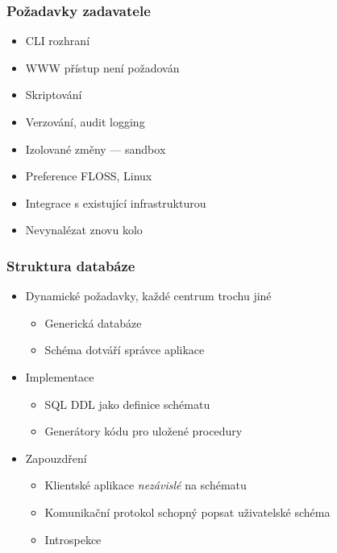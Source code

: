 \documentclass{beamer}
\begin{document}
\begin{frame}[fragile]
\frametitle{Požadavky zadavatele}
\begin{itemize}
    \item CLI rozhraní
    \item WWW přístup není požadován
    \item Skriptování
    \item Verzování, audit logging
    \item Izolované změny --- sandbox
    \item Preference FLOSS, Linux
    \item Integrace s existující infrastrukturou
    \item Nevynalézat znovu kolo
\end{itemize}
\end{frame}


\begin{frame}[fragile]
\frametitle{Struktura databáze}
\begin{itemize}
    \item Dynamické požadavky, každé centrum trochu jiné
        \begin{itemize}
            \item Generická databáze
            \item Schéma dotváří správce aplikace
        \end{itemize}
    \item Implementace
        \begin{itemize}
            \item SQL DDL jako definice schématu
            \item Generátory kódu pro uložené procedury
        \end{itemize}
    \item Zapouzdření
        \begin{itemize}
            \item Klientské aplikace {\em nezávislé} na schématu
            \item Komunikační protokol schopný popsat uživatelské schéma
            \item Introspekce
        \end{itemize}
\end{itemize}
\end{frame}
\end{document}
